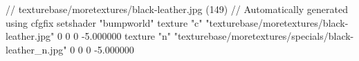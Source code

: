 // texturebase/moretextures/black-leather.jpg (149)
// Automatically generated using cfgfix
setshader "bumpworld"
texture "c" "texturebase/moretextures/black-leather.jpg" 0 0 0 -5.000000
texture "n" "texturebase/moretextures/specials/black-leather_n.jpg" 0 0 0 -5.000000
